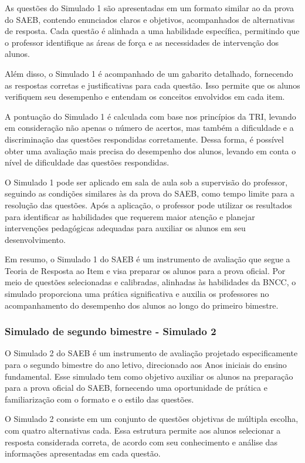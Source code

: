 As questões do Simulado 1 são apresentadas em um formato similar ao da
prova do SAEB, contendo enunciados claros e objetivos, acompanhados de
alternativas de resposta. Cada questão é alinhada a uma habilidade
específica, permitindo que o professor identifique as áreas de força e
as necessidades de intervenção dos alunos.

Além disso, o Simulado 1 é acompanhado de um gabarito detalhado,
fornecendo as respostas corretas e justificativas para cada questão.
Isso permite que os alunos verifiquem seu desempenho e entendam os
conceitos envolvidos em cada item.

A pontuação do Simulado 1 é calculada com base nos princípios da TRI,
levando em consideração não apenas o número de acertos, mas também a
dificuldade e a discriminação das questões respondidas corretamente.
Dessa forma, é possível obter uma avaliação mais precisa do desempenho
dos alunos, levando em conta o nível de dificuldade das questões
respondidas.

O Simulado 1 pode ser aplicado em sala de aula sob a supervisão do
professor, seguindo as condições similares às da prova do SAEB, como
tempo limite para a resolução das questões. Após a aplicação, o
professor pode utilizar os resultados para identificar as habilidades
que requerem maior atenção e planejar intervenções pedagógicas adequadas
para auxiliar os alunos em seu desenvolvimento.

Em resumo, o Simulado 1 do SAEB é um instrumento de avaliação que segue
a Teoria de Resposta ao Item e visa preparar os alunos para a prova
oficial. Por meio de questões selecionadas e calibradas, alinhadas às
habilidades da BNCC, o simulado proporciona uma prática significativa e
auxilia os professores no acompanhamento do desempenho dos alunos ao
longo do primeiro bimestre.

\subsubsection{Simulado de segundo bimestre - Simulado
2}\label{simulado-de-segundo-bimestre---simulado-2}

O Simulado 2 do SAEB é um instrumento de avaliação projetado
especificamente para o segundo bimestre do ano letivo, direcionado aos
Anos iniciais do ensino fundamental. Esse simulado tem como objetivo
auxiliar os alunos na preparação para a prova oficial do SAEB,
fornecendo uma oportunidade de prática e familiarização com o formato e
o estilo das questões.

O Simulado 2 consiste em um conjunto de questões objetivas de múltipla
escolha, com quatro alternativas cada. Essa estrutura permite aos alunos
selecionar a resposta considerada correta, de acordo com seu
conhecimento e análise das informações apresentadas em cada questão.

